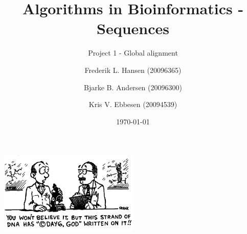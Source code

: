 \documentclass[a4paper, 12pt]{scrartcl}
\title{Algorithms in Bioinformatics - Sequences}
\subtitle{Project 1 - Global alignment}
\date{\today}
\author{Frederik L. Hansen (20096365)
\and
Bjarke B. Andersen (20096300)
\and
Kris V. Ebbesen (20094539)
}
\begin{document}
\maketitle
\begin{center}
	\includegraphics[width=0.5\textwidth]{day6.png}
\end{center}
\newpage
\tableofcontents
\newpage













 
\end{document}
